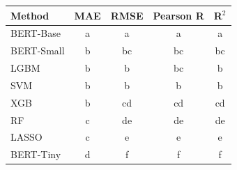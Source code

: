 \begin{tabular}{lcccc}
\toprule
Method & MAE & RMSE & Pearson R & R$^2$ \\
\midrule
BERT-Base & a & a & a & a \\
BERT-Small & b & bc & bc & bc \\
LGBM & b & b & bc & b \\
SVM & b & b & b & b \\
XGB & b & cd & cd & cd \\
RF & c & de & de & de \\
LASSO & c & e & e & e \\
BERT-Tiny & d & f & f & f \\
\bottomrule
\end{tabular}
